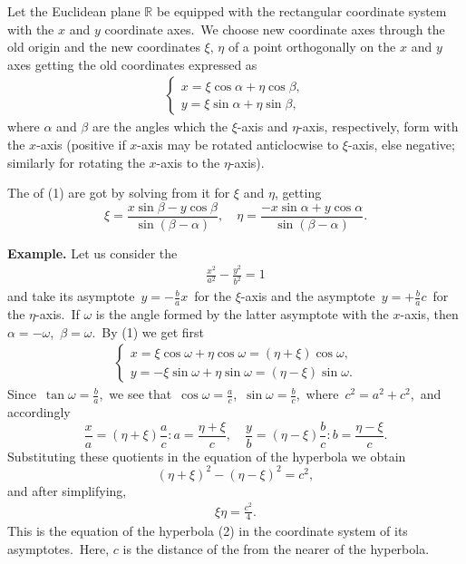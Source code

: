 \documentclass[12pt]{article}
\theoremstyle{definition}
\begin{document}
Let the Euclidean plane $\mathbb{R}$ be equipped with the rectangular coordinate system with the $x$ and $y$ coordinate axes.\, We choose new coordinate axes through the old origin and  the new coordinates $\xi$, $\eta$ of a point orthogonally on the $x$ and $y$ axes getting the old coordinates expressed as
\begin{align}
\begin{cases}
  x = \xi\cos\alpha+\eta\cos\beta,\\
  y = \xi\sin\alpha+\eta\sin\beta,
\end{cases}
\end{align}
where $\alpha$ and $\beta$ are the angles which the $\xi$-axis and $\eta$-axis, respectively, form with the $x$-axis (positive if $x$-axis may be rotated anticlocwise to $\xi$-axis, else negative; similarly for rotating the $x$-axis to the $\eta$-axis).

The  of (1) are got by solving from it for $\xi$ and $\eta$, getting
$$\xi = \frac{x\sin\beta-y\cos\beta}{\sin(\beta\!-\!\alpha)},\quad
 \eta = \frac{-x\sin\alpha+y\cos\alpha}{\sin(\beta\!-\!\alpha)}.$$

\textbf{Example.}\; Let us consider the 
\begin{align}
   \frac{x^2}{a^2}-\frac{y^2}{b^2} = 1
\end{align}
and take its asymptote \,$y = -\frac{b}{a}x$\, for the $\xi$-axis and the asymptote\, $y = +\frac{b}{a}c$\, for the $\eta$-axis.\, If $\omega$ is the angle formed by the latter asymptote with the $x$-axis, then\, $\alpha = -\omega$,\, $\beta = \omega$.\, By (1) we get first
\begin{align*}
\begin{cases}
  x = \xi\cos\omega+\eta\cos\omega = (\eta\!+\!\xi)\cos\omega,\\
  y = -\xi\sin\omega+\eta\sin\omega = (\eta\!-\!\xi)\sin\omega.
\end{cases}
\end{align*}
Since\, $\displaystyle\tan\omega = \frac{b}{a}$,\, we see that\, $\displaystyle\cos\omega = \frac{a}{c}$,\, $\displaystyle\sin\omega = \frac{b}{c}$,\, where\, $c^2 = a^2+c^2$,\, 
and accordingly
$$\frac{x}{a} = (\eta\!+\!\xi)\frac{a}{c}:a = \frac{\eta\!+\!\xi}{c},\quad
  \frac{y}{b} = (\eta\!-\!\xi)\frac{b}{c}:b = \frac{\eta\!-\!\xi}{c}.$$
Substituting these quotients in the equation of the hyperbola we obtain
           $$(\eta\!+\!\xi)^2-(\eta\!-\!\xi)^2 = c^2,$$
and after simplifying,
\begin{align}
      \xi\eta = \frac{c^2}{4}.
\end{align}
This is the equation of the hyperbola (2) in the coordinate system of its asymptotes.\, Here, $c$ is the distance of the  from the nearer  of the hyperbola.\\
\end{document}
